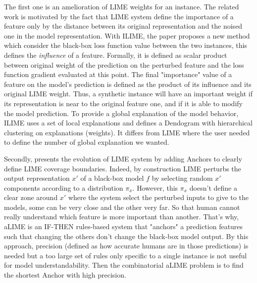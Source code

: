The first one is an amelioration of LIME weights for an instance. The related 
work is motivated by the fact that LIME system define the importance of a 
feature only by the distance between its original representation 
and the noised one in the model representation. With ILIME, the paper proposes a 
new method which consider the black-box loss function value between the two 
instances, this defines the \emph{influence} of a feature. 
Formally, it is defined as scalar product between original weight of the prediction 
on the perturbed feature and the loss function gradient evaluated at this point. 
The final "importance" value of a feature on the model's prediction is defined 
as the product of its influence and its original LIME weight. Thus, a synthetic 
instance will have an important weight if its representation is near to the 
original feature one, and if it is able to modify the model prediction.
To provide a global explanation of the model behavior, ILIME uses a set of 
local explanations and defines a Dendogram with hierarchical clustering on 
explanations (weights). It differs from LIME where the user needed to define 
the number of global explanation we wanted.


Secondly, \textcite{ribeiro_nothing_2016} presents the evolution of LIME system by adding Anchors to clearly define LIME coverage boundaries. Indeed, by construction LIME perturbs the output representation $x'$ of a black-box model $f$ by selecting random $x'$ components according to a distribution $\pi_x$. However, this $ \pi_x$ doesn't define a clear zone around $x'$ where the system select the perturbed inputs to give to the models, some can be very close and the other very far. So that human cannot really understand which feature is more important than another. 
That's why, aLIME is an IF-THEN rules-based system that "anchors" a prediction features such that changing the others don't change the black-box model output. By this approach, precision (defined as how accurate humans are in those predictions) is needed but a too large set of rules only specific to a single instance is not useful for model understandability. Then the combinatorial aLIME problem is to find the shortest Anchor with high precision. 

